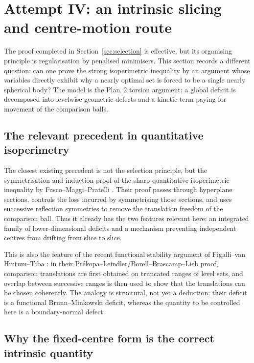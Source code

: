 \documentclass[11pt]{amsart}
\theoremstyle{definition}
\begin{document}
\section{Attempt IV: an intrinsic slicing and centre-motion route}
\label{sec:intrinsic}

The proof completed in Section~\ref{sec:selection} is effective, but its
organising principle is regularisation by penalised minimisers.  This
section records a different question: can one prove the strong
isoperimetric inequality by an argument whose variables directly exhibit
why a nearly optimal set is forced to be a single nearly spherical body?
The model is the Plan~2 torsion argument: a global deficit is decomposed
into levelwise geometric defects and a kinetic term paying for movement of
the comparison balls.

\subsection{The relevant precedent in quantitative isoperimetry}

The closest existing precedent is not the selection principle, but the
symmetrisation-and-induction proof of the sharp quantitative
isoperimetric inequality by Fusco--Maggi--Pratelli \cite{FMP}.  Their proof
passes through hyperplane sections, controls the loss incurred by
symmetrising those sections, and uses successive reflection symmetries to
remove the translation freedom of the comparison ball.  Thus it already
has the two features relevant here: an integrated family of
lower-dimensional deficits and a mechanism preventing independent centres
from drifting from slice to slice.

This is also the feature of the recent functional stability argument of
Figalli--van Hintum--Tiba \cite{FvHTPL}: in their
Pr\'ekopa--Leindler/Borell--Brascamp--Lieb proof, comparison translations
are first obtained on truncated ranges of level sets, and overlap between
successive ranges is then used to show that the translations can be chosen
coherently.  The analogy is structural, not yet a deduction: their
deficit is a functional Brunn--Minkowski deficit, whereas the quantity to
be controlled here is a boundary-normal defect.

\subsection{Why the fixed-centre form is the correct intrinsic quantity}
\end{document}
